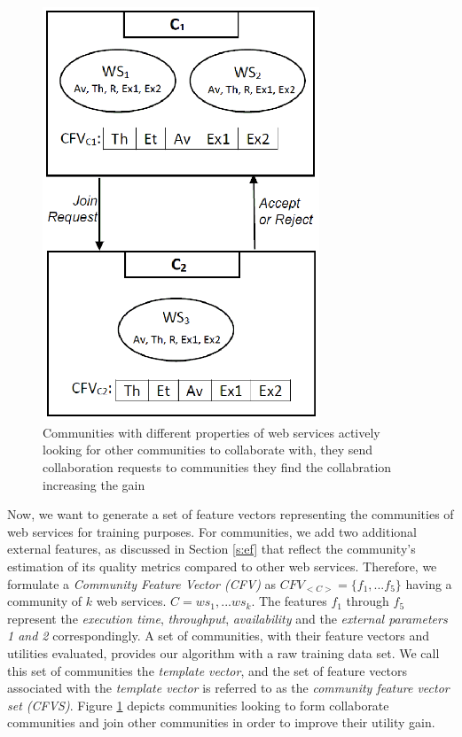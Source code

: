\begin{figure}%
\centerline{\includegraphics[width=3.25in]{figures/cfvs.eps}}
\caption{Communities with different properties of web services actively looking for other communities to collaborate with, they send collaboration requests to communities they find the collabration  increasing the gain}
\label{fig_community}
\end{figure}

Now, we want to generate a set of feature vectors representing the communities of web services for training purposes. For communities, we add two additional external features, as discussed in Section \ref{s:ef} that reflect the community's estimation of its quality metrics compared to other web services. Therefore, we formulate a \emph{Community Feature Vector (CFV)} as $CFV_{<C>} = \{f_1,...f_5\}$ having a community of $k$ web services. $C = {ws_1,...ws_k}$. The features $f_1$ through $f_5$ represent the \emph{execution time}, \emph{throughput}, \emph{availability} and the \emph{external parameters 1 and 2} correspondingly. A set of communities, with their feature vectors and utilities evaluated, provides our algorithm with a raw training data set. We call this set of communities the \emph{template vector}, and the set of feature vectors associated with the \emph{template vector} is referred to as the \emph{community feature vector set (CFVS)}. Figure \ref{fig_community} depicts communities looking to form collaborate communities and join other communities in order to improve their utility gain.

